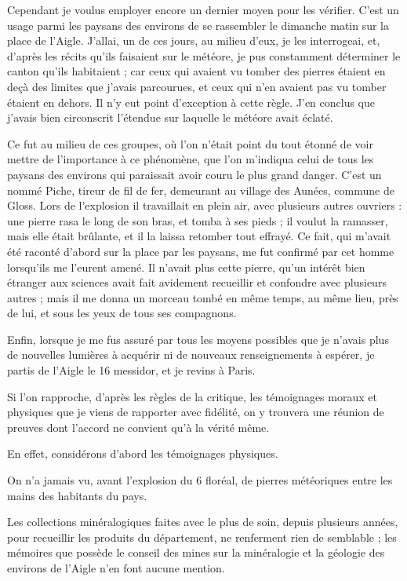 \documentclass[a4paper, 11pt, oneside, polutonikogreek, french]{article}
\begin{document}
Cependant je voulus employer encore un dernier moyen pour les vérifier. C'est un usage parmi les paysans des environs de se rassembler le dimanche matin sur la place de l'Aigle. J'allai, un de ces jours, au milieu d'eux, je les interrogeai, et, d'après les récits qu'ils faisaient sur le météore, je pus constamment déterminer le canton qu'ils habitaient ; car ceux qui avaient vu tomber des pierres étaient en deçà des limites que j'avais parcourues, et ceux qui n'en avaient pas vu tomber étaient en dehors. Il n'y eut point d'exception à cette règle. J'en conclus que j'avais bien circonscrit l'étendue sur laquelle le météore avait éclaté.

Ce fut au milieu de ces groupes, où l'on n'était point du tout étonné de voir mettre de l'importance à ce phénomène, que l'on m'indiqua celui de tous les paysans des environs qui paraissait avoir couru le plus grand danger. C'est un nommé Piche, tireur de fil de fer, demeurant au village des Aunées, commune de Gloss. Lors de l'explosion il travaillait en plein air, avec plusieurs autres ouvriers : une pierre rasa le long de son bras, et tomba à ses pieds ; il voulut la ramasser, mais elle était brûlante, et il la laissa retomber tout effrayé. Ce fait, qui m'avait été raconté d'abord sur la place par les paysans, me fut confirmé par cet homme lorsqu'ils me l'eurent amené. Il n'avait plus cette pierre, qu'un intérêt bien étranger aux sciences avait fait avidement recueillir et confondre avec plusieurs autres ; mais il me donna un morceau tombé en même temps, au même lieu, près de lui, et sous les yeux de tous ses compagnons.

Enfin, lorsque je me fus assuré par tous les moyens possibles que je n'avais plus de nouvelles lumières à acquérir ni de nouveaux renseignements à espérer, je partis de l'Aigle le 16 messidor, et je revins à Paris.

Si l'on rapproche, d'après les règles de la critique, les témoignages moraux et physiques que je viens de rapporter avec fidélité, on y trouvera une réunion de preuves dont l'accord ne convient qu'à la vérité même.

En effet, considérons d'abord les témoignages physiques.

On n'a jamais vu, avant l'explosion du 6 floréal, de pierres météoriques entre les mains des habitants du pays.

Les collections minéralogiques faites avec le plus de soin, depuis plusieurs années, pour recueillir les produits du département, ne renferment rien de semblable ; les mémoires que possède le conseil des mines sur la minéralogie et la géologie des environs de l'Aigle n'en font aucune mention.
\end{document}
